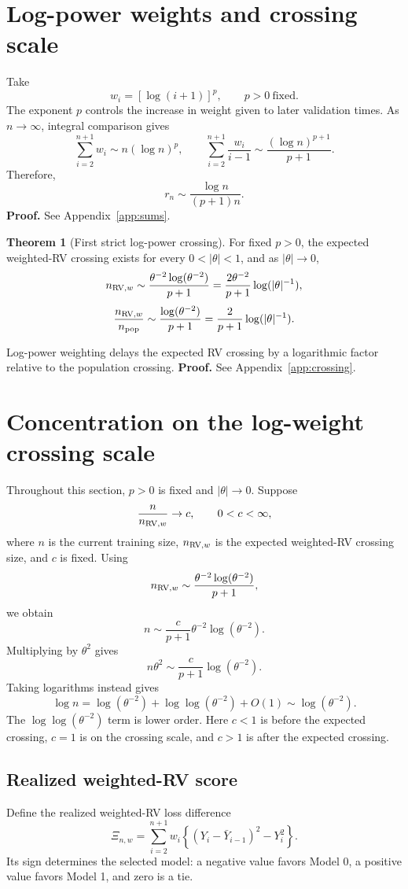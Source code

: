 \documentclass[11pt]{article}
\theoremstyle{definition}
\newtheorem{theorem}{Theorem}[section]
\begin{document}
\section{Log-power weights and crossing scale}
Take
\[
w_i=[\log(i+1)]^p,\qquad p>0\ \text{fixed}.
\]
The exponent $p$ controls the increase in weight given to later
validation times. As $n\to\infty$, integral comparison gives
\[
\sum_{i=2}^{n+1}w_i\sim n(\log n)^p,\qquad
\sum_{i=2}^{n+1}\frac{w_i}{i-1}
\sim\frac{(\log n)^{p+1}}{p+1}.
\]
Therefore,
\[
r_n\sim\frac{\log n}{(p+1)n}.
\]
\textbf{Proof.} See Appendix~\ref{app:sums}.

\begin{theorem}[First strict log-power crossing]
For fixed $p>0$, the expected weighted-RV crossing exists for every
$0<|\theta|<1$, and as $|\theta|\to0$,
\[
n_{{\rm RV},w}\sim\frac{\theta^{-2}\log(\theta^{-2})}{p+1}
=\frac{2\theta^{-2}}{p+1}\log(|\theta|^{-1}),
\]
\[
\frac{n_{{\rm RV},w}}{n_{\rm pop}}
\sim\frac{\log(\theta^{-2})}{p+1}
=\frac{2}{p+1}\log(|\theta|^{-1}).
\]
\end{theorem}
\noindent Log-power weighting delays the expected RV crossing by a
logarithmic factor relative to the population crossing.
\textbf{Proof.} See Appendix~\ref{app:crossing}.

\section{Concentration on the log-weight crossing scale}
Throughout this section, $p>0$ is fixed and $|\theta|\to0$. Suppose
\begin{equation}\label{eq:scale}
\frac{n}{n_{{\rm RV},w}}\to c,\qquad 0<c<\infty,
\end{equation}
where $n$ is the current training size, $n_{{\rm RV},w}$ is the
expected weighted-RV crossing size, and $c$ is fixed.
Using
\[
n_{{\rm RV},w}\sim\frac{\theta^{-2}\log(\theta^{-2})}{p+1},
\]
we obtain
\[
n\sim\frac{c}{p+1}\theta^{-2}\log(\theta^{-2}).
\]
Multiplying by $\theta^2$ gives
\[
n\theta^2\sim\frac{c}{p+1}\log(\theta^{-2}).
\]
Taking logarithms instead gives
\[
\log n=\log(\theta^{-2})+\log\log(\theta^{-2})+O(1)
\sim\log(\theta^{-2}).
\]
The $\log\log(\theta^{-2})$ term is lower order.
Here $c<1$ is before the expected crossing, $c=1$ is on the crossing
scale, and $c>1$ is after the expected crossing.

\subsection{Realized weighted-RV score}
Define the realized weighted-RV loss difference
\[
\Xi_{n,w}=\sum_{i=2}^{n+1}w_i
\left\{(Y_i-\bar Y_{i-1})^2-Y_i^2\right\}.
\]
Its sign determines the selected model: a negative value favors
Model 0, a positive value favors Model 1, and zero is a tie.
\end{document}
